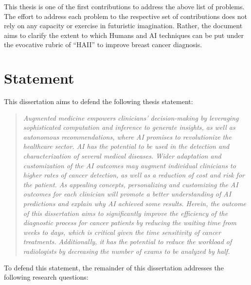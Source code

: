 This thesis is one of the first contributions to address the above list of problems.
The effort to address each problem to the respective set of contributions does not rely on any capacity or exercise in futuristic imagination.
Rather, the document aims to clarify the extent to which Humans and \ac{AI} techniques can be put under the evocative rubric of ``\ac{HAII}'' to improve breast cancer diagnosis.

\section{Statement }
\label{sec:chap001003}

\noindent
This dissertation aims to defend the following thesis statement:

\begin{quote}
{\it
Augmented medicine empowers clinicians' decision-making by leveraging sophisticated computation and inference to generate insights, as well as autonomous recommendations, where \ac{AI} promises to revolutionize the healthcare sector.
\ac{AI} has the potential to be used in the detection and characterization of several medical diseases.
Wider adaptation and customization of the \ac{AI} outcomes may augment individual clinicians to higher rates of cancer detection, as well as a reduction of cost and risk for the patient.
As appealing concepts, personalizing and customizing the \ac{AI} outcomes for each clinician will promote a better understanding of \ac{AI} predictions and explain why \ac{AI} achieved some results.
Herein, the outcome of this dissertation aims to significantly improve the efficiency of the diagnostic process for cancer patients by reducing the waiting time from weeks to days, which is critical given the time sensitivity of cancer treatments.
Additionally, it has the potential to reduce the workload of radiologists by decreasing the number of exams to be analyzed by half.
}
\end{quote}

\noindent
To defend this statement, the remainder of this dissertation addresses the following research questions:

